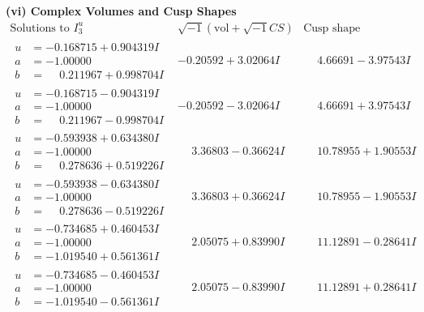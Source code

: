 \documentclass[1p]{elsarticle_modified}
\theoremstyle{definition}
\newcommand{\I}{\sqrt{-1}}
\begin{document}
\newpage\flushleft \textbf{(vi) Complex Volumes and Cusp Shapes}
$$\begin{array}{c|c|c}  
\text{Solutions to }I^u_{3}& \I (\text{vol} + \sqrt{-1}CS) & \text{Cusp shape}\\
 \hline 
\begin{aligned}
u &= -0.168715 + 0.904319 I \\
a &= -1.00000\phantom{ +0.000000I} \\
b &= \phantom{-}0.211967 + 0.998704 I\end{aligned}
 & -0.20592 + 3.02064 I & \phantom{-}4.66691 - 3.97543 I \\ \hline\begin{aligned}
u &= -0.168715 - 0.904319 I \\
a &= -1.00000\phantom{ +0.000000I} \\
b &= \phantom{-}0.211967 - 0.998704 I\end{aligned}
 & -0.20592 - 3.02064 I & \phantom{-}4.66691 + 3.97543 I \\ \hline\begin{aligned}
u &= -0.593938 + 0.634380 I \\
a &= -1.00000\phantom{ +0.000000I} \\
b &= \phantom{-}0.278636 + 0.519226 I\end{aligned}
 & \phantom{-}3.36803 - 0.36624 I & \phantom{-}10.78955 + 1.90553 I \\ \hline\begin{aligned}
u &= -0.593938 - 0.634380 I \\
a &= -1.00000\phantom{ +0.000000I} \\
b &= \phantom{-}0.278636 - 0.519226 I\end{aligned}
 & \phantom{-}3.36803 + 0.36624 I & \phantom{-}10.78955 - 1.90553 I \\ \hline\begin{aligned}
u &= -0.734685 + 0.460453 I \\
a &= -1.00000\phantom{ +0.000000I} \\
b &= -1.019540 + 0.561361 I\end{aligned}
 & \phantom{-}2.05075 + 0.83990 I & \phantom{-}11.12891 - 0.28641 I \\ \hline\begin{aligned}
u &= -0.734685 - 0.460453 I \\
a &= -1.00000\phantom{ +0.000000I} \\
b &= -1.019540 - 0.561361 I\end{aligned}
 & \phantom{-}2.05075 - 0.83990 I & \phantom{-}11.12891 + 0.28641 I \\ \hline\begin{aligned}

\end{aligned}
\end{array}$$
\end{document}
